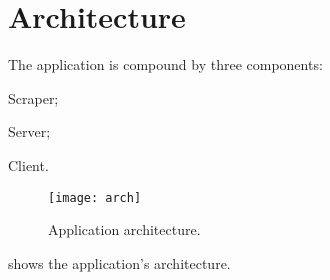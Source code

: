 \chapter{Architecture}\label{ch:arch}

The application is compound by three components:
\begin{enumerate*}[label=]
	\item Scraper;
	\item Server;
	\item Client.
\end{enumerate*}

\begin{figure}[p]
	\texttt{[image: arch]}
	\caption{Application architecture.}\label{fig:arch}
\end{figure}

 shows the application's architecture.







